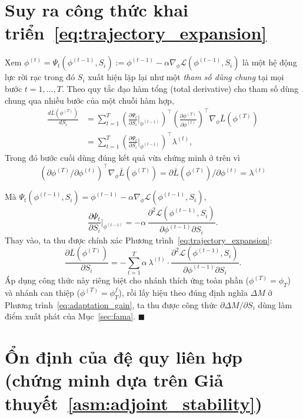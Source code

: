 \section{Suy ra công thức khai triển~\eqref{eq:trajectory_expansion}}

Xem $\phi^{(t)} = \Psi_t(\phi^{(t-1)}, S_i) := \phi^{(t-1)} - \alpha\nabla_\phi\mathcal{L}(\phi^{(t-1)},S_i)$ là một hệ động lực rời rạc trong đó $S_i$ xuất hiện lặp lại như một \emph{tham số dùng chung} tại mọi bước $t=1,\dots,T$. Theo quy tắc đạo hàm tổng (total derivative) cho tham số dùng chung qua nhiều bước của một chuỗi hàm hợp,
\begin{align*}
    \frac{d\bar L(\phi^{(T)})}{dS_i} &= \sum_{t=1}^{T} \left(\frac{\partial \Psi_t}{\partial S_i}\Big|_{\phi^{(t-1)}}\right)^{\!\top} \left(\frac{\partial \phi^{(T)}}{\partial \phi^{(t)}}\right)^{\!\top} \nabla_\phi \bar L(\phi^{(T)}) \\
    &= \sum_{t=1}^{T} \left(\frac{\partial \Psi_t}{\partial S_i}\Big|_{\phi^{(t-1)}}\right)^{\!\top} \lambda^{(t)},
\end{align*}
Trong đó bước cuối dùng đúng kết quả vừa chứng minh ở trên vì 
\[
(\partial\phi^{(T)}/\partial\phi^{(t)})^\top\nabla_\phi\bar L(\phi^{(T)}) = \partial\bar L(\phi^{(T)})/\partial\phi^{(t)} = \lambda^{(t)}
\]

Mà $\Psi_t(\phi^{(t-1)},S_i) = \phi^{(t-1)} - \alpha\nabla_\phi\mathcal{L}(\phi^{(t-1)},S_i)$,
\[
    \frac{\partial \Psi_t}{\partial S_i}\Big|_{\phi^{(t-1)}} = -\alpha\,\frac{\partial^2 \mathcal{L}(\phi^{(t-1)},S_i)}{\partial \phi^{(t-1)}\partial S_i}.
\]
Thay vào, ta thu được chính xác Phương trình~\eqref{eq:trajectory_expansion}:
\[
    \frac{\partial \bar L(\phi^{(T)})}{\partial S_i} = -\sum_{t=1}^{T}\alpha\,\lambda^{(t)}\cdot\frac{\partial^2\mathcal{L}(\phi^{(t-1)},S_i)}{\partial\phi^{(t-1)}\partial S_i}.
\]
Áp dụng công thức này riêng biệt cho nhánh thích ứng toàn phần ($\phi^{(T)}=\phi_T$) và nhánh can thiệp ($\phi^{(T)}=\phi_T^f$), rồi lấy hiệu theo đúng định nghĩa $\Delta M$ ở Phương trình~\eqref{eq:adaptation_gain}, ta thu được công thức $\partial\Delta M/\partial S_i$ dùng làm điểm xuất phát của Mục~\ref{sec:fama}. $\blacksquare$

\section{Ổn định của đệ quy liên hợp (chứng minh dựa trên Giả thuyết~\ref{asm:adjoint_stability})}


